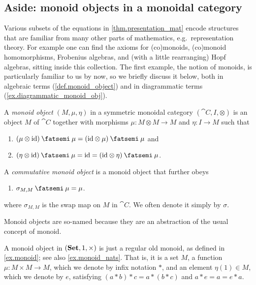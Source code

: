 \documentclass[7Sketches]{subfiles}
\begin{document}
\subsection{Aside: monoid objects in a monoidal category}
%
\label{ssec.alg_theories}%
%
%

Various subsets of the equations in \cref{thm.presentation_mat} encode
structures that are familiar from many other parts of mathematics, e.g.\
representation theory. For example one can find the axioms for (co)monoids,
(co)monoid homomorphisms, Frobenius algebras, and (with a little rearranging)
Hopf algebras, sitting inside this collection. The first example, the notion of
monoids, is particularly familiar to us by now, so we briefly discuss it below,
both in algebraic terms (\cref{def.monoid_object}) and in diagrammatic terms
(\cref{ex.diagrammatic_monoid_obj}).%

\begin{definition}%
\label{def.monoid_object}%
  A \emph{monoid object} $(M,\mu,\eta)$ in a symmetric monoidal category
  $(\cat{C},I,\otimes)$ is an object $M$ of $\cat{C}$ together with morphisms
  $\mu\colon M \otimes M \to M$ and $\eta\colon I \to M$ such that 
\begin{enumerate}[label=(\alph*)]
  \item $(\mu \otimes \id)\cp\mu = (\id \otimes \mu)\cp\mu$ and
  \item $(\eta \otimes \id)\cp\mu = \id = (\id \otimes \eta)\cp\mu$.
\end{enumerate}
A \emph{commutative monoid object} is a monoid object that further obeys
\begin{enumerate}[resume, label=(\alph*)]
  \item $\sigma_{M,M}\cp\mu = \mu$.
\end{enumerate}
where $\sigma_{M,M}$ is the swap map on $M$ in $\cat{C}$. We often denote it simply by $\sigma$.
\end{definition}

Monoid objects are so-named because they are an abstraction of the usual concept
of monoid.

\begin{example}
A monoid object in $(\mathbf{Set},1,\times)$ is just a regular old monoid, as defined in \cref{ex.monoid}; see also \cref{ex.monoid_nats}. That is, it is a set $M$, a function $\mu\colon M\times M\to M$, which we denote by infix notation $*$, and an element $\eta(1)\in M$, which we denote by $e$, satisfying $(a*b)*c=a*(b*c)$ and $a*e=a=e*a$.
\end{example}
\end{document}
